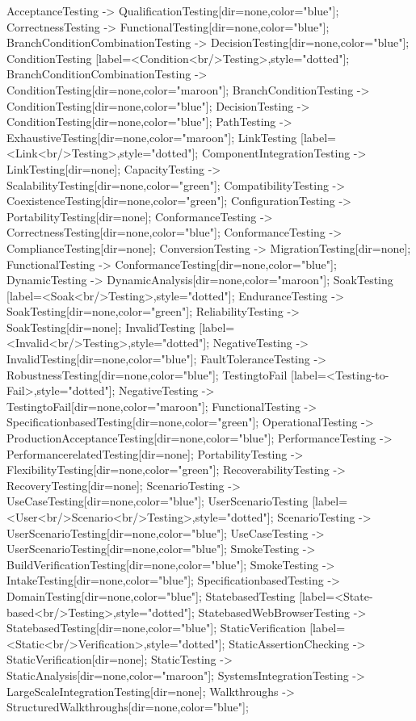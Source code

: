 \documentclass{article}
\begin{document}
{AcceptanceTesting -> QualificationTesting[dir=none,color="blue"];
CorrectnessTesting -> FunctionalTesting[dir=none,color="blue"];
BranchConditionCombinationTesting -> DecisionTesting[dir=none,color="blue"];
ConditionTesting [label=<Condition<br/>Testing>,style="dotted"];
BranchConditionCombinationTesting -> ConditionTesting[dir=none,color="maroon"];
BranchConditionTesting -> ConditionTesting[dir=none,color="blue"];
DecisionTesting -> ConditionTesting[dir=none,color="blue"];
PathTesting -> ExhaustiveTesting[dir=none,color="maroon"];
LinkTesting [label=<Link<br/>Testing>,style="dotted"];
ComponentIntegrationTesting -> LinkTesting[dir=none];
CapacityTesting -> ScalabilityTesting[dir=none,color="green"];
CompatibilityTesting -> CoexistenceTesting[dir=none,color="green"];
ConfigurationTesting -> PortabilityTesting[dir=none];
ConformanceTesting -> CorrectnessTesting[dir=none,color="blue"];
ConformanceTesting -> ComplianceTesting[dir=none];
ConversionTesting -> MigrationTesting[dir=none];
FunctionalTesting -> ConformanceTesting[dir=none,color="blue"];
DynamicTesting -> DynamicAnalysis[dir=none,color="maroon"];
SoakTesting [label=<Soak<br/>Testing>,style="dotted"];
EnduranceTesting -> SoakTesting[dir=none,color="green"];
ReliabilityTesting -> SoakTesting[dir=none];
InvalidTesting [label=<Invalid<br/>Testing>,style="dotted"];
NegativeTesting -> InvalidTesting[dir=none,color="blue"];
FaultToleranceTesting -> RobustnessTesting[dir=none,color="blue"];
TestingtoFail [label=<Testing-to-Fail>,style="dotted"];
NegativeTesting -> TestingtoFail[dir=none,color="maroon"];
FunctionalTesting -> SpecificationbasedTesting[dir=none,color="green"];
OperationalTesting -> ProductionAcceptanceTesting[dir=none,color="blue"];
PerformanceTesting -> PerformancerelatedTesting[dir=none];
PortabilityTesting -> FlexibilityTesting[dir=none,color="green"];
RecoverabilityTesting -> RecoveryTesting[dir=none];
ScenarioTesting -> UseCaseTesting[dir=none,color="blue"];
UserScenarioTesting [label=<User<br/>Scenario<br/>Testing>,style="dotted"];
ScenarioTesting -> UserScenarioTesting[dir=none,color="blue"];
UseCaseTesting -> UserScenarioTesting[dir=none,color="blue"];
SmokeTesting -> BuildVerificationTesting[dir=none,color="blue"];
SmokeTesting -> IntakeTesting[dir=none,color="blue"];
SpecificationbasedTesting -> DomainTesting[dir=none,color="blue"];
StatebasedTesting [label=<State-based<br/>Testing>,style="dotted"];
StatebasedWebBrowserTesting -> StatebasedTesting[dir=none,color="blue"];
StaticVerification [label=<Static<br/>Verification>,style="dotted"];
StaticAssertionChecking -> StaticVerification[dir=none];
StaticTesting -> StaticAnalysis[dir=none,color="maroon"];
SystemsIntegrationTesting -> LargeScaleIntegrationTesting[dir=none];
Walkthroughs -> StructuredWalkthroughs[dir=none,color="blue"];


}
\end{document}
